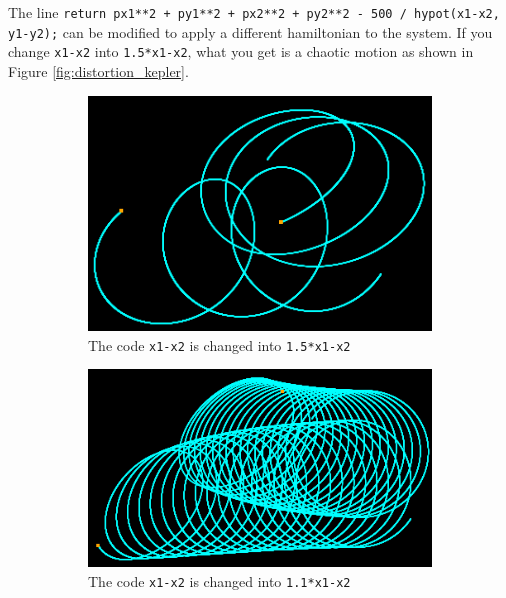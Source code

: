\documentclass[12pt]{article}
\begin{document}
The line \texttt{return px1**2 + py1**2 + px2**2 + py2**2 - 500 / hypot(x1-x2, y1-y2);}
can be modified to apply a different hamiltonian to the system.
If you change \texttt{x1-x2} into \texttt{1.5*x1-x2},
what you get is a chaotic motion as shown in Figure \ref{fig:distortion_kepler}.

\begin{figure}[h]
  \centering
  \begin{subfigure}[b]{0.4\linewidth}
    \includegraphics[width=\linewidth]{distortion_kepler.png}
    \caption{The code \texttt{x1-x2} is changed into \texttt{1.5*x1-x2}}
  \end{subfigure}
  \begin{subfigure}[b]{0.4\linewidth}
    \includegraphics[width=\linewidth]{distortion2_kepler.png}
    \caption{The code \texttt{x1-x2} is changed into \texttt{1.1*x1-x2}}
  \end{subfigure}
  \begin{subfigure}[b]{0.6\linewidth}

\end{subfigure}
\end{figure}
\end{document}
